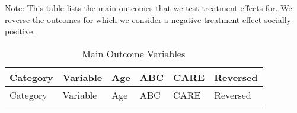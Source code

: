 

\begin{center}
\begin{ThreePartTable}

\begin{TableNotes}
Note: This table lists the main outcomes that we test treatment effects for. We reverse the outcomes for which we consider a negative treatment effect socially positive.
\end{TableNotes}


\begin{longtable}{L{4cm} L{5cm} C{1cm} C{1cm} C{1.2cm} C{1.5cm}}

\caption{Main Outcome Variables} \label{tab:main-outcomes} \\

\toprule
Category	&	Variable	&	Age	&	ABC	&	CARE	&	Reversed	\\ \midrule
\endfirsthead

\toprule
Category	&	Variable	&	Age	&	ABC	&	CARE	&	Reversed	\\ \midrule
\endhead

\midrule
\endfoot

\endlastfoot


\end{longtable}
\end{ThreePartTable}
\end{center}
